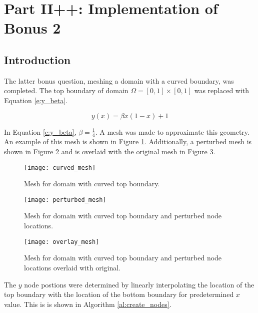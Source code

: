\documentclass[a4paper, 12pt]{article}
\title{}
\begin{document}
\section*{Part II++: Implementation of Bonus 2}
\subsection{Introduction}\label{sec:intro}
The latter bonus question, meshing a domain with a curved 
boundary, was completed. 
The top boundary of domain $\Omega = [0,1] \times [0,1]$
was replaced with Equation \eqref{e:y_beta}.

\begin{equation} \label{e:y_beta}
y(x) = \beta x ( 1 - x) +1
\end{equation}

In Equation \eqref{e:y_beta}, $\beta = \frac{1}{4}$. 
A mesh was made to approximate this geometry.
An example of this mesh is shown in Figure \ref{fig:mesh}.
Additionally, a perturbed mesh is shown 
in Figure \ref{fig:pMesh} and is overlaid with
the original mesh in Figure \ref{fig:overlap}.

\begin{figure}[H]
  \centering
  \texttt{[image: curved\_mesh]}
  \caption{ Mesh for domain with curved top boundary.}
  \label{fig:mesh}
\end{figure}

\begin{figure}[H]
  \centering
  \texttt{[image: perturbed\_mesh]}
  \caption{ Mesh for domain with curved top boundary 
            and perturbed node locations.}
  \label{fig:pMesh}
\end{figure}

\begin{figure}[H]
  \centering
  \texttt{[image: overlay\_mesh]}
  \caption{ Mesh for domain with curved top boundary 
            and perturbed node locations overlaid
            with original.}
  \label{fig:overlap}
\end{figure}

The $y$ node postions were determined by linearly interpolating the 
location of the top boundary with the location of the bottom boundary
for predetermined $x$ value. 
This is is shown in Algorithm \ref{al:create_nodes}.
\end{document}
